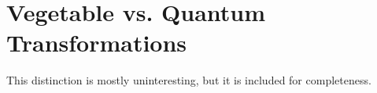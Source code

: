 \chapter{Vegetable vs. Quantum Transformations}
\label{ch:transf}

This distinction is mostly uninteresting, but it is included for completeness.